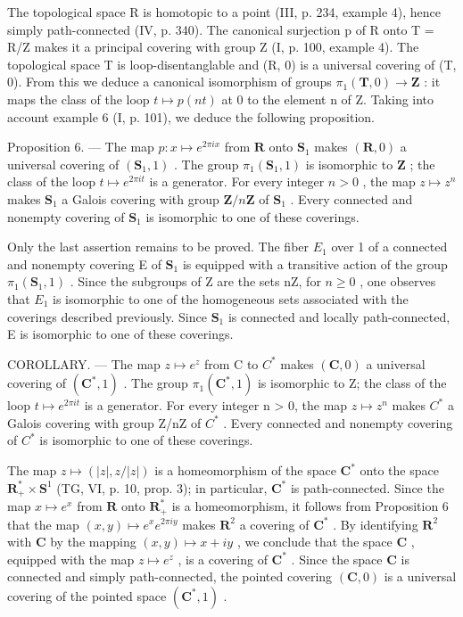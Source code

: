 
The topological space R is homotopic to a point (III, p. 234, example 4), hence simply path-connected (IV, p. 340). The canonical surjection p of R onto T = R/Z makes it a principal covering with group Z (I, p. 100, example 4). The topological space T is loop-disentanglable and (R, 0) is a universal covering of (T, 0). From this we deduce a canonical isomorphism of groups \(\pi_{1}(\mathbf{T}, 0) \to \mathbf{Z}\) : it maps the class of the loop \(t \mapsto p(nt)\) at 0 to the element n of Z. Taking into account example 6 (I, p. 101), we deduce the following proposition.

Proposition 6. — The map \(p \colon x \mapsto e^{2\pi ix}\) from \(\mathbf{R}\) onto \(\mathbf{S}_1\) makes \((\mathbf{R}, 0)\) a universal covering of \((\mathbf{S}_1, 1)\) . The group \(\pi_1(\mathbf{S}_1, 1)\) is isomorphic to \(\mathbf{Z}\) ; the class of the loop \(t \mapsto e^{2\pi it}\) is a generator. For every integer \(n > 0\) , the map \(z \mapsto z^n\) makes \(\mathbf{S}_1\) a Galois covering with group \(\mathbf{Z}/n\mathbf{Z}\) of \(\mathbf{S}_1\) . Every connected and nonempty covering of \(\mathbf{S}_1\) is isomorphic to one of these coverings.

Only the last assertion remains to be proved. The fiber \(E_{1}\) over 1 of a connected and nonempty covering E of \(\mathbf{S}_{1}\) is equipped with a transitive action of the group \(\pi_{1}(\mathbf{S}_{1},1)\) . Since the subgroups of Z are the sets nZ, for \(n \geqslant 0\) , one observes that \(E_{1}\) is isomorphic to one of the homogeneous sets associated with the coverings described previously. Since \(\mathbf{S}_{1}\) is connected and locally path-connected, E is isomorphic to one of these coverings.

COROLLARY. --- The map \(z \mapsto e^{z}\) from C to \(C^{*}\) makes \((\mathbf{C},0)\) a universal covering of \((\mathbf{C}^{*},1)\) . The group \(\pi_{1}(\mathbf{C}^{*},1)\) is isomorphic to Z; the class of the loop \(t \mapsto e^{2\pi it}\) is a generator. For every integer n \textgreater{} 0, the map \(z \mapsto z^{n}\) makes \(C^{*}\) a Galois covering with group Z/nZ of \(C^{*}\) . Every connected and nonempty covering of \(C^{*}\) is isomorphic to one of these coverings.

The map \(z \mapsto (|z|, z/|z|)\) is a homeomorphism of the space \(\mathbf{C}^*\) onto the space \(\mathbf{R}_+^* \times \mathbf{S}^1\) (TG, VI, p. 10, prop. 3); in particular, \(\mathbf{C}^*\) is path-connected. Since the map \(x \mapsto e^x\) from \(\mathbf{R}\) onto \(\mathbf{R}_+^*\) is a homeomorphism, it follows from Proposition 6 that the map \((x, y) \mapsto e^x e^{2\pi iy}\) makes \(\mathbf{R}^2\) a covering of \(\mathbf{C}^*\) . By identifying \(\mathbf{R}^2\) with \(\mathbf{C}\) by the mapping \((x, y) \mapsto x + iy\) , we conclude that the space \(\mathbf{C}\) , equipped with the map \(z \mapsto e^z\) , is a covering of \(\mathbf{C}^*\) . Since the space \(\mathbf{C}\) is connected and simply path-connected, the pointed covering \((\mathbf{C}, 0)\) is a universal covering of the pointed space \((\mathbf{C}^*, 1)\) .

